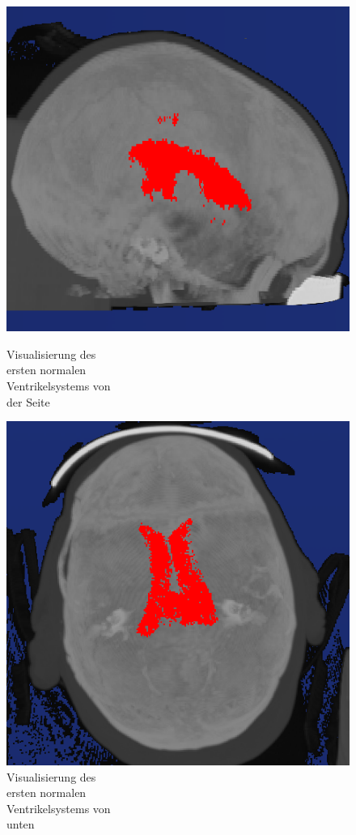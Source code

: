 \begin{figure}[H]
\begin{minipage}[t]{.5\textwidth}
  \centering
  \includegraphics[width=.9\linewidth, height=.9\linewidth]{Logos/Normal1/Seite2.PNG}
  \caption{Visualisierung des \\ ersten normalen \\ Ventrikelsystems von \\ der Seite}
  \label{fig:norm1_s}
\end{minipage}%
\begin{minipage}[t]{.5\textwidth}
  \centering
  \includegraphics[width=.9\linewidth, height=.9\linewidth]{Logos/Normal1/Unten3.PNG}
  \caption{Visualisierung des \\ ersten normalen \\ Ventrikelsystems von \\ unten}
  \label{fig:norm1_u}
\end{minipage}
\end{figure}

